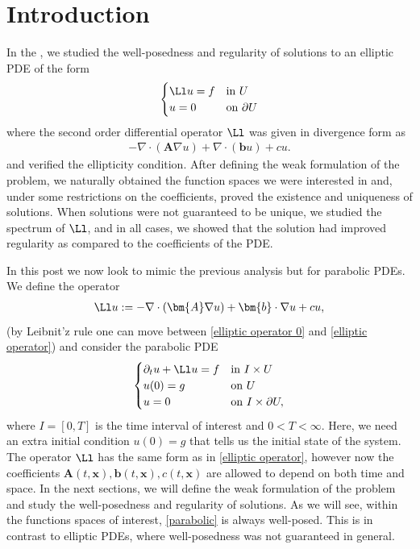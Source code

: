 \documentclass[
    a4paper,
    DIV=14,
    abstract=true,
    numbers=noenddot
]{scrartcl}
\begin{document}
\section{Introduction}
In the , we studied the well-posedness and regularity of solutions to an elliptic PDE of the form
\begin{align*}
  \begin{cases}
    \Ll u = f & \text{in } U     \\
 u = 0   & \text{on } \partial U
  \end{cases}
\end{align*}
where the second order differential operator $\Ll$ was given in divergence form as
\begin{align}\label{elliptic operator 0}
 -\nabla \cdot (\bm{A} \nabla u)+ \nabla \cdot (\bm{b} u)+cu.
\end{align}
and verified the ellipticity condition. After defining the weak formulation of the problem, we naturally obtained the function spaces we were interested in and, under some restrictions on the coefficients, proved the existence and uniqueness of solutions. When solutions were not guaranteed to be unique, we studied the spectrum of $\Ll $, and in all cases, we showed that the solution had improved regularity as compared to the coefficients of the PDE.

In this post we now look to mimic the previous analysis but for parabolic PDEs. We define the operator
\begin{align}\label{elliptic operator}
 \Ll u:= -\nabla \cdot (\bm{A} \nabla u)+ \bm{b} \cdot \nabla u+cu,
\end{align}
(by Leibnit'z rule one can move between \eqref{elliptic operator 0} and \eqref{elliptic operator}) and consider the parabolic PDE
\begin{align}\label{parabolic}
  \begin{cases}
    \partial_t u + \Ll u = f & \text{in } I\times U      \\
 u(0) = g         & \text{on } U          \\
 u = 0          & \text{on } I\times \partial U,
  \end{cases}
\end{align}
where $I=[0,T]$ is the time interval of interest and $0<T< \infty$.
Here, we need an extra initial condition $u(0) = g$ that tells us the initial state of the system. The operator $\Ll$ has the same form as in \eqref{elliptic operator}, however now the coefficients $\bm{A}(t, \bm{x}), \bm{b}(t, \bm{x}), c(t, \bm{x})$ are allowed to depend on both time and space. In the next sections, we will define the weak formulation of the problem and study the well-posedness and regularity of solutions. As we will see, within the functions spaces of interest, \eqref{parabolic} is always well-posed. This is in contrast to elliptic PDEs, where well-posedness was not guaranteed in general.
\end{document}
